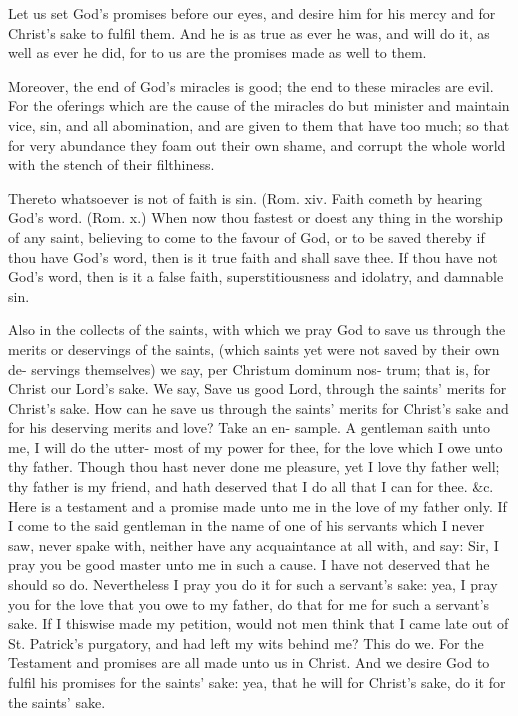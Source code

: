 \documentclass{custom}
\begin{document}
Let us set God's promises before our eyes, and desire 
him for his mercy and for Christ's sake to fulfil them. 
And he is as true as ever he was, and will do it, as well 
as ever he did, for to us are the promises made as well 
to them. 

Moreover, the end of God's miracles is good; the end to 
these miracles are evil. For the oferings which are the 
cause of the miracles do but minister and maintain vice, 
sin, and all abomination, and are given to them that have 
too much; so that for very abundance they foam out their 
own shame, and corrupt the whole world with the stench 
of their filthiness. 

Thereto whatsoever is not of faith is sin. (Rom. xiv. 
Faith cometh by hearing God's word. (Rom. x.) When 
now thou fastest or doest any thing in the worship of any
saint, believing to come to the favour of God, or to be saved 
thereby if thou have God's word, then is it true faith and 
shall save thee. If thou have not God's word, then is it a
false faith, superstitiousness and idolatry, and damnable 
sin. 

Also in the collects of the saints, with which we pray
God to save us through the merits or deservings of the 
saints, (which saints yet were not saved by their own de- 
servings themselves) we say, per Christum dominum nos-
trum; that is, for Christ our Lord's sake. We say, Save us 
good Lord, through the saints' merits for Christ's sake.
How can he save us through the saints' merits for Christ's 
sake and for his deserving merits and love? Take an en- 
sample. A gentleman saith unto me, I will do the utter- 
most of my power for thee, for the love which I owe unto 
thy father. Though thou hast never done me pleasure, 
yet I love thy father well; thy father is my friend, and hath 
deserved that I do all that I can for thee. &c. Here is a 
testament and a promise made unto me in the love of my 
father only. If I come to the said gentleman in the name 
of one of his servants which I never saw, never spake with, 
neither have any acquaintance at all with, and say: Sir, 
I pray you be good master unto me in such a cause. I
have not deserved that he should so do. Nevertheless I
pray you do it for such a servant's sake: yea, I pray you
for the love that you owe to my father, do that for me for
such a servant's sake. If I thiswise made my petition,
would not men think that I came late out of St. Patrick's
purgatory, and had left my wits behind me? This do we.
For the Testament and promises are all made unto us in
Christ. And we desire God to fulfil his promises for
the saints' sake: yea, that he will for Christ's sake, do it
for the saints' sake.
\end{document}
